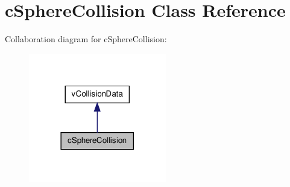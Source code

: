 \hypertarget{classc_sphere_collision}{
\section{cSphereCollision Class Reference}
\label{classc_sphere_collision}
}


Collaboration diagram for cSphereCollision:\nopagebreak
\begin{figure}[H]
\begin{center}
\leavevmode
\includegraphics[width=170pt]{classc_sphere_collision__coll__graph}
\end{center}
\end{figure}
